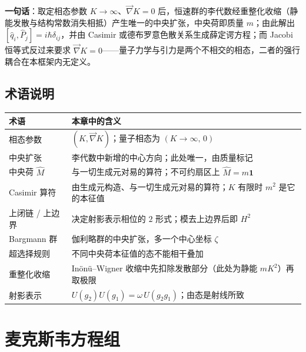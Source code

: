 \documentclass[
  chinese,
  a4paper,
  UTF8,
  12pt,
  oneside,
  openany]{ctexbook}
\newcounter{none} %
\theoremstyle{plain}
\theoremstyle{plain}
\theoremstyle{plain}
\theoremstyle{definition}
\theoremstyle{plain}
\theoremstyle{plain}
\theoremstyle{remark}
\begin{document}
\textbf{一句话}：取定相态参数 \(K\to\infty\)、\(\vec\nabla K=0\)
后，恒速群的李代数经重整化收缩（静能发散与结构常数消失相抵）产生唯一的中央扩张，中央荷即质量
\(m\)；由此解出 \([\hat q_i,\hat P_j]=i\hbar\delta_{ij}\)，并由 Casimir
或德布罗意色散关系生成薛定谔方程；而 Jacobi 恒等式反过来要求
\(\vec\nabla K=0\)------量子力学与引力是两个不相交的相态，二者的强行耦合在本框架内无定义。

\section{术语说明}\label{sec-qp-terms}

{\def\LTcaptype{none} %
\begin{longtable}[]{@{}
  >{\raggedright\arraybackslash}p{}
  >{\raggedright\arraybackslash}p{}@{}}
\toprule\noalign{}
\begin{minipage}[b]{\linewidth}\raggedright
术语
\end{minipage} & \begin{minipage}[b]{\linewidth}\raggedright
本章中的含义
\end{minipage} \\
\midrule\noalign{}
\endhead
\bottomrule\noalign{}
\endlastfoot
相态参数 & \((K,\vec\nabla K)\)；量子相态为 \((K\to\infty,\,0)\) \\
中央扩张 & 李代数中新增的中心方向；此处唯一，由质量标记 \\
中央荷 \(\hat M\) & 与一切生成元对易的算符；不可约扇区上
\(\hat M=m\mathbf 1\) \\
Casimir 算符 & 由生成元构造、与一切生成元对易的算符；\(K\) 有限时
\(m^{2}\) 是它的本征值 \\
上闭链 / 上边界 & 决定射影表示相位的 \(2\) 形式；模去上边界后即
\(H^{2}\) \\
Bargmann 群 & 伽利略群的中央扩张，多一个中心坐标 \(\zeta\) \\
超选择规则 & 不同中央荷本征值的态不能相干叠加 \\
重整化收缩 & Inönü--Wigner 收缩中先扣除发散部分（此处为静能
\(mK^{2}\)）再取极限 \\
射影表示 & \(U(g_2)U(g_1)=\omega\,U(g_2g_1)\)；由态是射线所致 \\
\end{longtable}
}


\chapter{麦克斯韦方程组}\label{sec-maxwell-equations}
\end{document}

